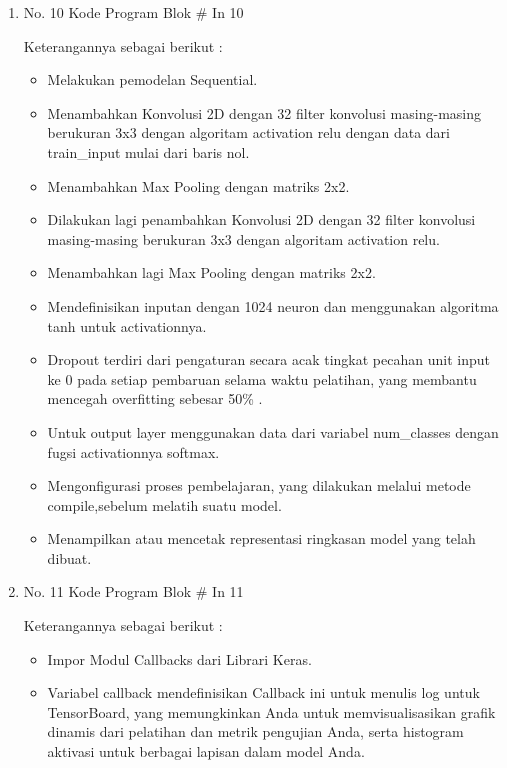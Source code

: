 \begin{enumerate}
\item No. 10 Kode Program Blok \# In 10
\par 
Keterangannya sebagai berikut :
\begin{itemize}
\item Melakukan pemodelan Sequential.
\item Menambahkan Konvolusi 2D dengan 32 filter konvolusi masing-masing berukuran 3x3 dengan algoritam activation relu dengan data dari train\_input mulai dari baris nol.
\item Menambahkan Max Pooling dengan matriks 2x2.
\item Dilakukan lagi penambahkan Konvolusi 2D dengan 32 filter konvolusi masing-masing berukuran 3x3 dengan algoritam activation relu.
\item Menambahkan lagi Max Pooling dengan matriks 2x2.
\item Mendefinisikan inputan dengan 1024 neuron dan menggunakan algoritma tanh untuk activationnya.
\item Dropout terdiri dari pengaturan secara acak tingkat pecahan unit input ke 0 pada setiap pembaruan selama waktu pelatihan, yang membantu mencegah overfitting sebesar 50\% .
\item Untuk output layer menggunakan data dari variabel num\_classes dengan fugsi activationnya softmax.
\item Mengonfigurasi proses pembelajaran, yang dilakukan melalui metode compile,sebelum melatih suatu model.
\item Menampilkan atau mencetak representasi ringkasan model yang telah dibuat.
\end{itemize}


\item No. 11 Kode Program Blok \# In 11
\par 
Keterangannya sebagai berikut :
\begin{itemize}
\item Impor Modul Callbacks dari Librari Keras.
\item Variabel callback mendefinisikan Callback ini untuk menulis log untuk TensorBoard, yang memungkinkan Anda untuk memvisualisasikan grafik dinamis dari pelatihan dan metrik pengujian Anda, serta histogram aktivasi untuk berbagai lapisan dalam model Anda.
\end{itemize}


\end{enumerate}
